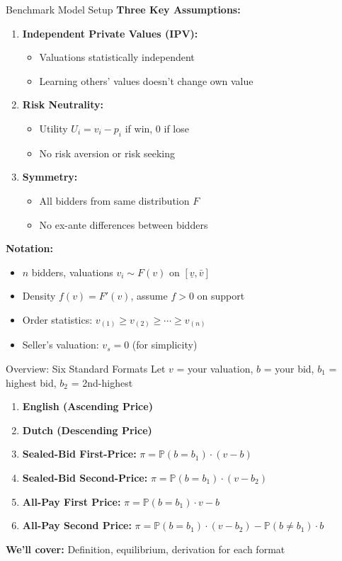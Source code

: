 \documentclass[xcolor={x11names}, aspectratio=169 ]{beamer}
\begin{document}
\begin{frame}{Benchmark Model Setup}
\textbf{Three Key Assumptions:}
\begin{enumerate}
  \item \textbf{Independent Private Values (IPV):} 
  \begin{itemize}
    \item Valuations statistically independent
    \item Learning others' values doesn't change own value
  \end{itemize}
  \item \textbf{Risk Neutrality:} 
  \begin{itemize}
    \item Utility $U_i = v_i - p_i$ if win, 0 if lose
    \item No risk aversion or risk seeking
  \end{itemize}
  \item \textbf{Symmetry:} 
  \begin{itemize}
    \item All bidders from same distribution $F$
    \item No ex-ante differences between bidders
  \end{itemize}
\end{enumerate}

\textbf{Notation:}
\begin{itemize}
  \item $n$ bidders, valuations $v_i \sim F(v)$ on $[\underline{v}, \bar{v}]$
  \item Density $f(v) = F'(v)$, assume $f > 0$ on support
  \item Order statistics: $v_{(1)} \geq v_{(2)} \geq \cdots \geq v_{(n)}$
  \item Seller's valuation: $v_s = 0$ (for simplicity)
\end{itemize}
\end{frame}

\begin{frame}{Overview: Six Standard Formats}
Let $v$ = your valuation, $b$ = your bid, $b_1$ = highest bid, $b_2$ = 2nd-highest

\begin{enumerate}
  \item \textbf{English (Ascending Price)}
  \item \textbf{Dutch (Descending Price)}
  \item \textbf{Sealed-Bid First-Price:} $\pi = \mathbb{P}(b = b_1) \cdot (v - b)$
  \item \textbf{Sealed-Bid Second-Price:} $\pi = \mathbb{P}(b = b_1) \cdot (v - b_2)$
  \item \textbf{All-Pay First Price:} $\pi = \mathbb{P}(b = b_1) \cdot v - b$
  \item \textbf{All-Pay Second Price:} $\pi = \mathbb{P}(b = b_1) \cdot (v - b_2) - \mathbb{P}(b \neq b_1) \cdot b$
\end{enumerate}

\textbf{We'll cover:} Definition, equilibrium, derivation for each format
\end{frame}
\end{document}
